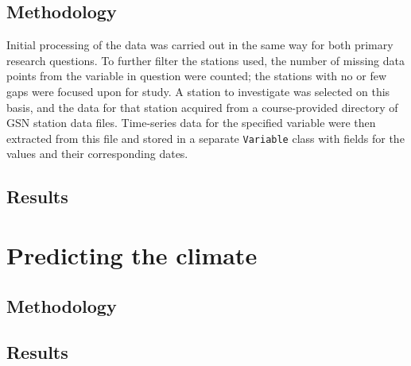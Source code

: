 \documentclass[12pt]{article}
\newcommand{\code}[1]{\texttt{#1}}
\begin{document}
\subsection{Methodology}


Initial processing of the data was carried out in the same way for both primary research questions. To further filter the stations used, 
the number of missing data points from the variable in question were counted; the stations with no or few gaps were focused upon for study. 
A station to investigate was selected on this basis, and the data for that station acquired from a course-provided directory of GSN station 
data files. Time-series data for the specified variable were then extracted from this file and stored in a separate \code{Variable} class 
with fields for the values and their corresponding dates.

\subsection{Results}
\section{Predicting the climate}
\subsection{Methodology}
\subsection{Results}
\end{document}
